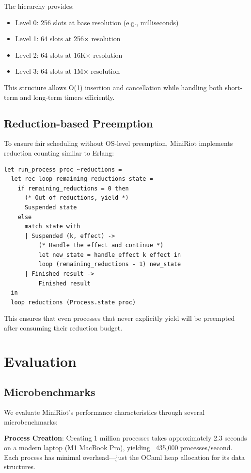 \documentclass[sigplan,screen]{acmart}
\begin{document}
The hierarchy provides:
\begin{itemize}
\item Level 0: 256 slots at base resolution (e.g., milliseconds)
\item Level 1: 64 slots at 256× resolution  
\item Level 2: 64 slots at 16K× resolution
\item Level 3: 64 slots at 1M× resolution
\end{itemize}

This structure allows O(1) insertion and cancellation while handling both short-term and long-term timers efficiently.

\subsection{Reduction-based Preemption}

To ensure fair scheduling without OS-level preemption, MiniRiot implements reduction counting similar to Erlang:

\begin{lstlisting}
let run_process proc ~reductions =
  let rec loop remaining_reductions state =
    if remaining_reductions = 0 then
      (* Out of reductions, yield *)
      Suspended state
    else
      match state with
      | Suspended (k, effect) ->
          (* Handle the effect and continue *)
          let new_state = handle_effect k effect in
          loop (remaining_reductions - 1) new_state
      | Finished result -> 
          Finished result
  in
  loop reductions (Process.state proc)
\end{lstlisting}

This ensures that even processes that never explicitly yield will be preempted after consuming their reduction budget.

\section{Evaluation}

\subsection{Microbenchmarks}

We evaluate MiniRiot's performance characteristics through several microbenchmarks:

\textbf{Process Creation}: Creating 1 million processes takes approximately 2.3 seconds on a modern laptop (M1 MacBook Pro), yielding ~435,000 processes/second. Each process has minimal overhead—just the OCaml heap allocation for its data structures.
\end{document}
